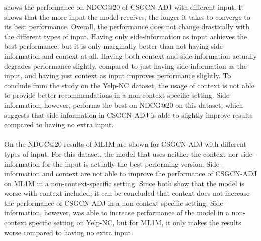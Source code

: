  shows the performance on NDCG@20 of CSGCN-ADJ with different input.
It shows that the more input the model receives, the longer it takes to converge to its best performance.
Overall, the performance does not change drastically with the different types of input.
Having only side-information as input achieves the best performance, but it is only marginally better than not having side-information and context at all.
Having both context and side-information actually degrades performance slightly, compared to just having side-information as the input, and having just context as input improves performance slightly.
To conclude from the study on the Yelp-NC dataset, the usage of context is not able to provide better recommendations in a non-context-specific setting.
Side-information, however, performs the best on NDCG@20 on this dataset, which suggests that side-information in CSGCN-ADJ is able to slightly improve results compared to having no extra input.
\\\\
On  the NDGC@20 results of ML1M are shown for CSGCN-ADJ with different types of input. 
For this dataset, the model that uses neither the context nor side-information for the input is actually the best performing version.
Side-information and context are not able to improve the performance of CSGCN-ADJ on ML1M in a non-context-specific setting.
Since both  show that the model is worse with context included, it can be concluded that context does not increase the performance of CSGCN-ADJ in a non-context specific setting.
Side-information, however, was able to increase performance of the model in a non-context specific setting on Yelp-NC, but for ML1M, it only makes the results worse compared to having no extra input.

